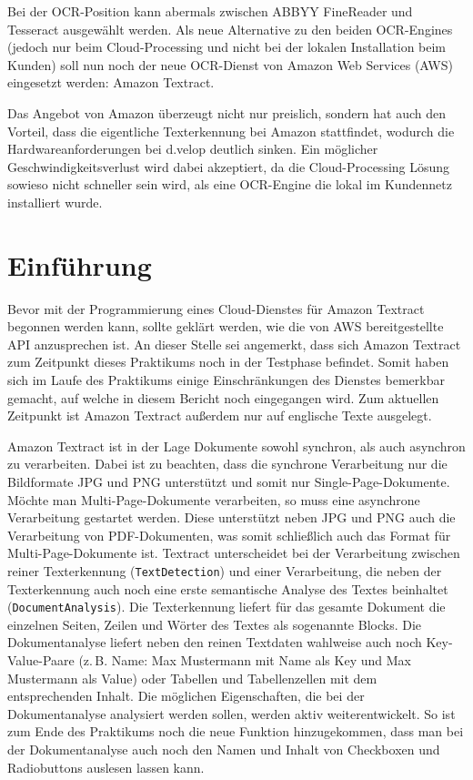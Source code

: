 \documentclass{whswinvcbook}
\begin{document}
Bei der OCR-Position kann abermals zwischen ABBYY FineReader und Tesseract ausgewählt werden. Als neue Alternative zu den beiden OCR-Engines (jedoch nur beim Cloud-Processing und nicht bei der lokalen Installation beim Kunden) soll nun noch der neue OCR-Dienst von Amazon Web Services (AWS) eingesetzt werden: Amazon Textract.

Das Angebot von Amazon überzeugt nicht nur preislich, sondern hat auch den Vorteil, dass die eigentliche Texterkennung bei Amazon stattfindet, wodurch die Hardwareanforderungen bei d.velop deutlich sinken. Ein möglicher Geschwindigkeitsverlust wird dabei akzeptiert, da die Cloud-Processing Lösung sowieso nicht schneller sein wird, als eine OCR-Engine die lokal im Kundennetz installiert wurde.
\section{Einführung}
Bevor mit der Programmierung eines Cloud-Dienstes für Amazon Textract begonnen werden kann, sollte geklärt werden, wie die von AWS bereitgestellte API anzusprechen ist. An dieser Stelle sei angemerkt, dass sich Amazon Textract zum Zeitpunkt dieses Praktikums noch in der Testphase befindet. Somit haben sich im Laufe des Praktikums einige Einschränkungen des Dienstes bemerkbar gemacht, auf welche in diesem Bericht noch eingegangen wird. Zum aktuellen Zeitpunkt ist Amazon Textract außerdem nur auf englische Texte ausgelegt.

Amazon Textract ist in der Lage Dokumente sowohl synchron, als auch asynchron zu verarbeiten. Dabei ist zu beachten, dass die synchrone Verarbeitung nur die Bildformate JPG und PNG unterstützt und somit nur Single-Page-Dokumente. Möchte man Multi-Page-Dokumente verarbeiten, so muss eine asynchrone Verarbeitung gestartet werden. Diese unterstützt neben JPG und PNG auch die Verarbeitung von PDF-Dokumenten, was somit schließlich auch das Format für Multi-Page-Dokumente ist. Textract unterscheidet bei der Verarbeitung zwischen reiner Texterkennung (\texttt{TextDetection}) und einer Verarbeitung, die neben der Texterkennung auch noch eine erste semantische Analyse des Textes beinhaltet (\texttt{DocumentAnalysis}). Die Texterkennung liefert für das gesamte Dokument die einzelnen Seiten, Zeilen und Wörter des Textes als sogenannte Blocks. Die Dokumentanalyse liefert neben den reinen Textdaten wahlweise auch noch Key-Value-Paare (z.\,B. Name: Max Mustermann mit Name als Key und Max Mustermann als Value) oder Tabellen und Tabellenzellen mit dem entsprechenden Inhalt. Die möglichen Eigenschaften, die bei der Dokumentanalyse analysiert werden sollen, werden aktiv weiterentwickelt. So ist zum Ende des Praktikums noch die neue Funktion hinzugekommen, dass man bei der Dokumentanalyse auch noch den Namen und Inhalt von Checkboxen und Radiobuttons auslesen lassen kann.
\end{document}
